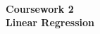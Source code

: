 
\begin{titlepage}

    \begin{center}
    
    
    
    
    
    \HRule \\[1cm]
    { \huge \bfseries Coursework 2}\\[0.5cm]
    { \huge \bfseries Linear Regression}\\[0.5cm]
    \HRule \\[1.5cm]
    

\end{center}
\end{titlepage}
